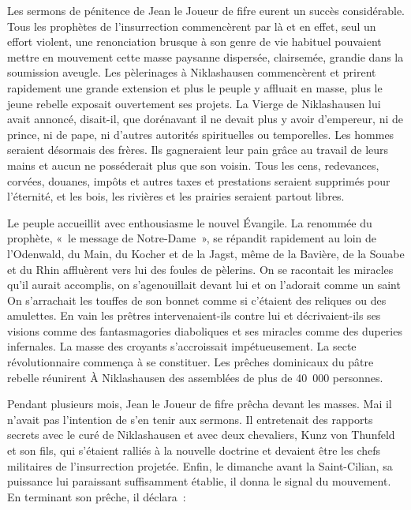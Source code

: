 \documentclass[french,twoside]{book} %
\begin{document}
Les sermons de pénitence de Jean le Joueur de fifre eurent un succès considérable. Tous les prophètes de l’insurrection commencèrent par là et en effet, seul un effort violent, une renonciation brusque à son genre de vie habituel pouvaient mettre en mouvement cette masse paysanne dispersée, clairsemée, grandie dans la soumission aveugle. Les pèlerinages à Niklashausen commencèrent et prirent rapidement une grande extension et plus le peuple y affluait en masse, plus le jeune rebelle exposait ouvertement ses projets. La Vierge de Niklashausen lui avait annoncé, disait-il, que dorénavant il ne devait plus y avoir d’empereur, ni de prince, ni de pape, ni d’autres autorités spirituelles ou temporelles. Les hommes seraient désormais des frères. Ils gagneraient leur pain grâce au travail de leurs mains et aucun ne posséderait plus que son voisin. Tous les cens, redevances, corvées, douanes, impôts et autres taxes et prestations seraient supprimés pour l’éternité, et les bois, les rivières et les prairies seraient partout libres.\par
Le peuple accueillit avec enthousiasme le nouvel Évangile. La renommée du prophète, « le message de Notre-Dame », se répandit rapidement au loin de l’Odenwald, du Main, du Kocher et de la Jagst, même de la Bavière, de la Souabe et du Rhin affluèrent vers lui des foules de pèlerins. On se racontait les miracles qu’il aurait accomplis, on s’agenouillait devant lui et on l’adorait comme un saint On s’arrachait les touffes de son bonnet comme si c’étaient des reliques ou des amulettes. En vain les prêtres intervenaient-ils contre lui et décrivaient-ils ses visions comme des fantasmagories diaboliques et ses miracles comme des duperies infernales. La masse des croyants s’accroissait impétueusement. La secte révolutionnaire commença à se constituer. Les prêches dominicaux du pâtre rebelle réunirent À Niklashausen des assemblées de plus de 40 000 personnes.\par
Pendant plusieurs mois, Jean le Joueur de fifre prêcha devant les masses. Mai il n’avait pas l’intention de s’en tenir aux sermons. Il entretenait des rapports secrets avec le curé de Niklashausen et avec deux chevaliers, Kunz von Thunfeld et son fils, qui s’étaient ralliés à la nouvelle doctrine et devaient être les chefs militaires de l’insurrection projetée. Enfin, le dimanche avant la Saint-Cilian, sa puissance lui paraissant suffisamment établie, il donna le signal du mouvement. En terminant son prêche, il déclara :\par
\end{document}
